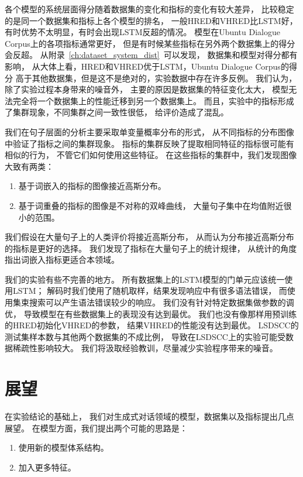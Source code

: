 各个模型的系统层面得分随着数据集的变化和指标的变化有较大差异，
比较稳定的是同一个数据集和指标上各个模型的排名，
一般HRED和VHRED比LSTM好，
有时优势不太明显，有时会出现LSTM反超的情况。
模型在Ubuntu Dialogue Corpus上的各项指标通常更好，
但是有时候某些指标在另外两个数据集上的得分会反超。
从附录~\ref{ch:dataset_system_dist}~可以发现，
数据集和模型对得分都有影响，
从大体上看，HRED和VHRED优于LSTM，Ubuntu Dialogue Corpus的得分
高于其他数据集，但是这不是绝对的，实验数据中存在许多反例。
我们认为，除了实验过程本身带来的噪音外，
主要的原因是数据集的特征变化太大，
模型无法完全将一个数据集上的性能迁移到另一个数据集上。
而且，实验中的指标形成了集群现象，不同集群之间一致性很低，
给评价造成了混乱。

我们在句子层面的分析主要采取单变量概率分布的形式，
从不同指标的分布图像中验证了指标之间的集群现象。
指标的集群反映了提取相同特征的指标很可能有相似的行为，
不管它们如何使用这些特征。
在这些指标的集群中，我们发现图像大致有两类：
\begin{enumerate}
    \item 基于词嵌入的指标的图像接近高斯分布。
    \item 基于词重叠的指标的图像是不对称的双峰曲线， 大量句子集中在均值附近很小的范围。
\end{enumerate}
我们假设在大量句子上的人类评价将接近高斯分布，
从而认为分布接近高斯分布的指标是更好的选择。
我们发现了指标在大量句子上的统计规律，
从统计的角度指出词嵌入指标更适合本领域。

我们的实验有些不完善的地方。
所有数据集上的LSTM模型的门单元应该统一使用LSTM；
解码时我们使用了随机取样，结果发现响应中有很多语法错误，
而使用集束搜索可以产生语法错误较少的响应。
我们没有针对特定数据集做参数的调优，
导致模型在有些数据集上的表现没有达到最优。
我们也没有像那样用预训练的HRED初始化VHRED的参数，
结果VHRED的性能没有达到最优。
LSDSCC的测试集样本数与其他两个数据集的不成比例，
导致在LSDSCC上的实验可能受数据稀疏性影响较大。
我们将汲取经验教训，尽量减少实验程序带来的噪音。

\section{展望}\label{sec:future_work}
在实验结论的基础上，
我们对生成式对话领域的模型，数据集以及指标提出几点展望。
在模型方面，我们提出两个可能的思路是：
\begin{enumerate}
    \item 使用新的模型体系结构。
    \item 加入更多特征。
\end{enumerate}

